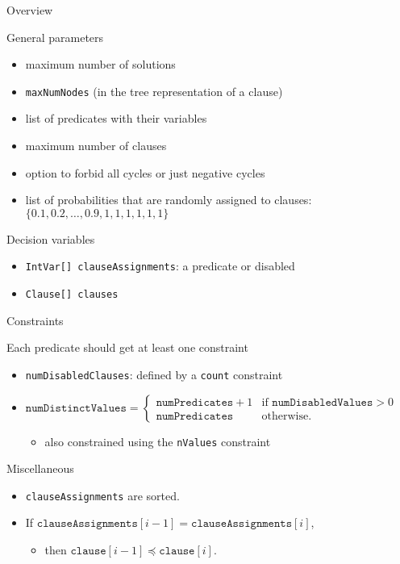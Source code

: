 \documentclass{beamer}
\begin{document}
\begin{frame}{Overview}
  \begin{block}{General parameters}
    \begin{itemize}
    \item maximum number of solutions
    \item \texttt{maxNumNodes} (in the tree representation of a clause)
    \item list of predicates with their variables
    \item maximum number of clauses
    \item option to forbid all cycles or just negative cycles
    \item list of probabilities that are randomly assigned to clauses: $\{ 0.1,
      0.2, \dots, 0.9, 1, 1, 1, 1, 1, 1 \}$
    \end{itemize}
  \end{block}
  \begin{block}{Decision variables}
    \begin{itemize}
    \item \texttt{IntVar[] clauseAssignments}: a predicate or disabled
    \item \texttt{Clause[] clauses}
    \end{itemize}
  \end{block}
\end{frame}

\begin{frame}{Constraints}
  \begin{block}{Each predicate should get at least one constraint}
    \begin{itemize}
    \item \texttt{numDisabledClauses}: defined by a \texttt{count} constraint
    \item $\texttt{numDistinctValues} = \begin{cases}
        \texttt{numPredicates} + 1 & \text{if } \texttt{numDisabledValues} > 0 \\
        \texttt{numPredicates} & \text{otherwise.}
      \end{cases}$
      \begin{itemize}
      \item also constrained using the \texttt{nValues} constraint
      \end{itemize}
    \end{itemize}
  \end{block}
  \begin{block}{Miscellaneous}
    \begin{itemize}
    \item \texttt{clauseAssignments} are sorted.
    \item If $\texttt{clauseAssignments}[i-1] = \texttt{clauseAssignments}[i]$,
      \begin{itemize}
      \item then $\texttt{clause}[i-1] \preceq \texttt{clause}[i]$.
      \end{itemize}
    \end{itemize}
  \end{block}
\end{frame}
\end{document}

